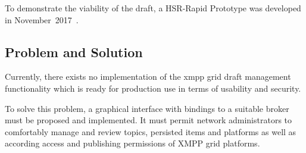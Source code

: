 To demonstrate the viability of the draft, a HSR-Rapid Prototype was developed in November~2017~\cite{xmpp-grid-prototype}.

\subsection{Problem and Solution}
Currently, there exists no implementation of the \gls{xmpp} grid draft management functionality which is ready for production use in terms of usability and security.

To solve this problem, a graphical interface with bindings to a suitable \gls{broker} must be proposed and implemented.
It must permit network administrators to comfortably manage and review \glspl{topic}, persisted items and \glspl{platform} as well as according access and publishing permissions of XMPP grid \glspl{platform}.


